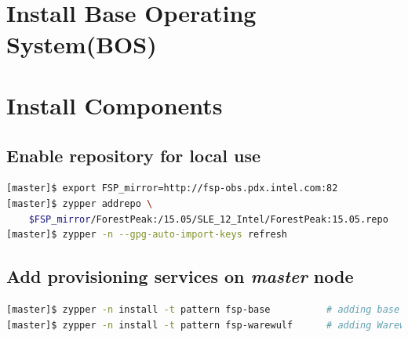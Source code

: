 \documentclass[letterpaper]{article}
\begin{document}
 \\

 \\




\section{Install Base Operating System(BOS)}



\section{Install \FSP{} Components} \label{sec:basic_install}


\subsection{Enable \FSP{} repository for local use}


\begin{lstlisting}[language=bash,keywords={}]
[master]$ export FSP_mirror=http://fsp-obs.pdx.intel.com:82
[master]$ zypper addrepo \
    $FSP_mirror/ForestPeak:/15.05/SLE_12_Intel/ForestPeak:15.05.repo
[master]$ zypper -n --gpg-auto-import-keys refresh
\end{lstlisting}


\subsection{Add provisioning services on {\em master} node}


\begin{lstlisting}[language=bash,keywords={}]
[master]$ zypper -n install -t pattern fsp-base          # adding base FSP packages
[master]$ zypper -n install -t pattern fsp-warewulf      # adding Warewulf support
\end{lstlisting}
\end{document}
